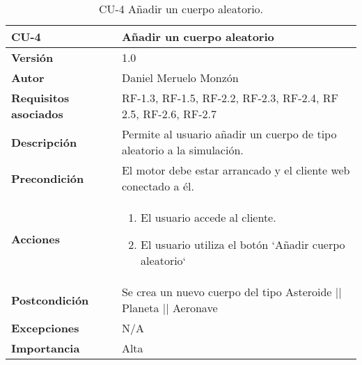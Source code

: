 \begin{table}[p]
	\centering
	\begin{tabularx}{\linewidth}{ p{} p{} }
		\toprule
		\textbf{CU-4}    & \textbf{Añadir un cuerpo aleatorio}\\
		\toprule
		\textbf{Versión}              & 1.0    \\
		\textbf{Autor}                & Daniel Meruelo Monzón \\
		\textbf{Requisitos asociados} & RF-1.3, RF-1.5, RF-2.2, RF-2.3, RF-2.4, RF 2.5, RF-2.6, RF-2.7 \\
		\textbf{Descripción}          & Permite al usuario añadir un cuerpo de tipo aleatorio a la simulación. \\
		\textbf{Precondición}         & El motor debe estar arrancado y el cliente web conectado a él. \\
		\textbf{Acciones}             &
		\begin{enumerate}
			\def\labelenumi{\arabic{enumi}.}
			\tightlist
			\item El usuario accede al cliente.
			\item El usuario utiliza el botón `Añadir cuerpo aleatorio`
		\end{enumerate}\\
		\textbf{Postcondición}        & Se crea un nuevo cuerpo del tipo Asteroide || Planeta || Aeronave\\
		\textbf{Excepciones}          & N/A \\
		\textbf{Importancia}          & Alta\\
		\bottomrule
	\end{tabularx}
	\caption{CU-4 Añadir un cuerpo aleatorio.}
\end{table}
